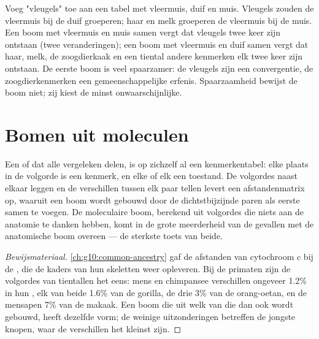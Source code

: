 \begin{example}\label{ex:g12:phylogenetic-trees:parsimony}
Voeg "vleugels" toe aan een tabel met vleermuis, duif en muis. Vleugels
zouden de vleermuis bij de duif groeperen; haar en melk groeperen de
vleermuis bij de muis. Een boom met vleermuis en muis samen vergt dat
vleugels twee keer zijn ontstaan (twee veranderingen); een boom met
vleermuis en duif samen vergt dat haar, melk, de zoogdierkaak en een
tiental andere kenmerken elk twee keer zijn ontstaan. De eerste boom is
veel spaarzamer: de vleugels zijn een convergentie, de zoogdierkenmerken
een gemeenschappelijke erfenis. Spaarzaamheid bewijst de boom niet; zij
kiest de minst onwaarschijnlijke.
\end{example}

\section{Bomen uit moleculen}

\begin{proposition}\label{prop:g12:phylogenetic-trees:molecular}
Een  of  dat alle vergeleken  delen, is op zichzelf al een
kenmerkentabel: elke plaats in de volgorde is een kenmerk, en elke
 of elk  een toestand. De volgordes naast elkaar
leggen en de verschillen tussen elk paar tellen levert een
afstandenmatrix op, waaruit een boom wordt gebouwd door de dichtstbijzijnde
paren als eerste samen te voegen. De moleculaire boom, berekend uit
volgordes die niets aan de anatomie te danken hebben, komt in de grote
meerderheid van de gevallen met de anatomische boom overeen --- de
sterkste toets van beide.
\end{proposition}
\begin{proof}[Bewijsmateriaal]
\cref{ch:g10:common-ancestry} gaf de afstanden van cytochroom c bij de
, die de kaders van hun skeletten weer opleveren. Bij de
primaten zijn de volgordes van tientallen  het eens: mens en
chimpansee verschillen ongeveer 1.2\% in hun , elk van beide 1.6\% van
de gorilla, de drie 3\% van de orang-oetan, en de mensapen 7\% van de
makaak. Een boom die uit welk van die  dan ook wordt gebouwd, heeft
dezelfde vorm; de weinige uitzonderingen betreffen de jongste knopen,
waar de verschillen het kleinst zijn.
\end{proof}

